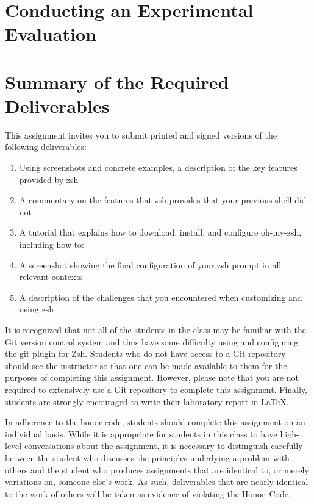 \section*{Conducting an Experimental Evaluation}



\section*{Summary of the Required Deliverables}

This assignment invites you to submit printed and signed versions of the following deliverables:

\begin{enumerate}

    \item Using screenshots and concrete examples, a description of the key features provided by zsh

    \item A commentary on the features that zsh provides that your previous shell did not

    \item A tutorial that explains how to download, install, and configure oh-my-zsh, including how to:

    \item A screenshot showing the final configuration of your zsh prompt in all relevant contexts

    \item A description of the challenges that you encountered when customizing and using zsh

\end{enumerate}

It is recognized that not all of the students in the class may be familiar with the Git version control system and thus have some
difficulty using and configuring the git plugin for Zsh.  Students who do not have access to a Git repository should see the
instructor so that one can be made available to them for the purposes of completing this assignment. However, please note that you
are not required to extensively use a Git repository to complete this assignment. Finally, students are strongly encouraged to
write their laboratory report in \LaTeX.

In adherence to the honor code, students should complete this assignment on an individual basis. While it is appropriate for
students in this class to have high-level conversations about the assignment, it is necessary to distinguish carefully between the
student who discusses the principles underlying a problem with others and the student who produces assignments that are identical
to, or merely variations on, someone else's work.  As such, deliverables that are nearly identical to the work of others will be
taken as evidence of violating the \mbox{Honor Code}.


